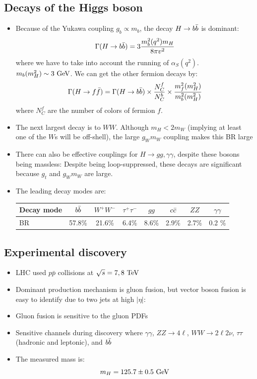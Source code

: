 \subsection{Decays of the Higgs boson}
\begin{itemize}
  \item Because of the Yukawa coupling $g_b \propto m_b$, the decay $H\rightarrow b\bar{b}$ is dominant:
  \begin{equation}
    \Gamma(H\rightarrow b\bar{b}) = 3 \frac{m_b^2(q^2) m_H}{8\pi v^2}
  \end{equation}
  where we have to take into account the running of $\alpha_S(q^2)$. $m_b(m_H^2) \sim 3~\text{GeV}$. We can get the other fermion decays by:
  \begin{equation}
    \Gamma(H\rightarrow f\bar f) = \Gamma(H\rightarrow b\bar{b}) \times\frac{N_{C}^f}{N_{C}^b}\times\frac{m_f^2(m_H^2)}{m_b^2(m_H^2)}
  \end{equation}
  where $N_C^f$ are the number of colors of fermion $f$.
  \item The next largest decay is to $WW$. Although $m_H < 2m_W$ (implying at least one of the $W$s will be off-shell), the large $g_W m_W$ coupling makes this BR large
  \item There can also be effective couplings for $H\rightarrow gg,\gamma\gamma$, despite these bosons being massless:
  Despite being loop-suppressed, these decays are significant because $g_t$ and $g_Wm_W$ are large.
  \item The leading decay modes are:
  \begin{center}
  \begin{tabular}{l|ccccccc}
    Decay mode & $b\bar{b}$ & $W^+W^-$ & $\tau^+ \tau^-$ & $gg$ & $c\bar{c}$ & $ZZ$ & $\gamma\gamma$\\ \hline
    BR & 57.8\% & 21.6\% & 6.4\% & 8.6\% & 2.9\% & 2.7\% & 0.2 \%
  \end{tabular}
  \end{center}
\end{itemize}

\subsection{Experimental discovery}
\begin{itemize}
  \item LHC used $p\bar p$ collisions at $\sqrt{s} = 7,8~\text{TeV}$
  \item Dominant production mechanism is gluon fusion, but vector boson fusion is easy to identify due to two jets at high $|\eta|$:
  \item Gluon fusion is sensitive to the gluon PDFs
  \item Sensitive channels during discovery where $\gamma\gamma$, $ZZ\rightarrow 4\ell$, $WW\rightarrow 2\ell 2\nu$, $\tau\tau$ (hadronic and leptonic), and $b\bar{b}$
  \item The measured mass is:
  \begin{equation}
    m_H = 125.7 \pm 0.5~\text{GeV}
  \end{equation}
\end{itemize}

